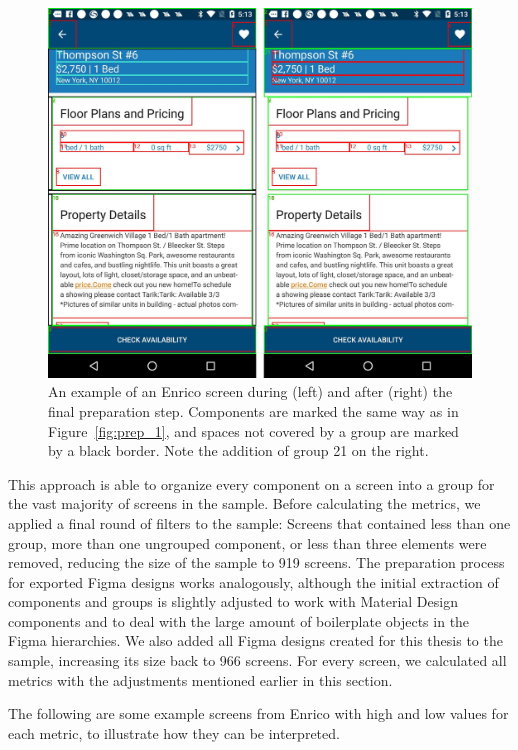 \documentclass[11pt,titlepage,oneside,openany]{book}
\begin{document}
\begin{figure}[H]
	\centering
	\includegraphics[width=.75\textwidth]{figures/grouping_example_step_3.jpg}
	\caption{An example of an Enrico screen during (left) and after (right) the final preparation step. Components are marked the same way as in Figure~\ref{fig:prep_1}, and spaces not covered by a group are marked by a black border. Note the addition of group 21 on the right.}
	\label{fig:prep_3}
\end{figure}

This approach is able to organize every component on a screen into a group for the vast majority of screens in the sample. Before calculating the metrics, we applied a final round of filters to the sample: Screens that contained less than one group, more than one ungrouped component, or less than three elements were removed, reducing the size of the sample to 919 screens. The preparation process for exported Figma designs works analogously, although the initial extraction of components and groups is slightly adjusted to work with Material Design components and to deal with the large amount of boilerplate objects in the Figma hierarchies. We also added all Figma designs created for this thesis to the sample, increasing its size back to 966 screens. For every screen, we calculated all metrics with the adjustments mentioned earlier in this section. 

The following are some example screens from Enrico with high and low values for each metric, to illustrate how they can be interpreted.
\end{document}
